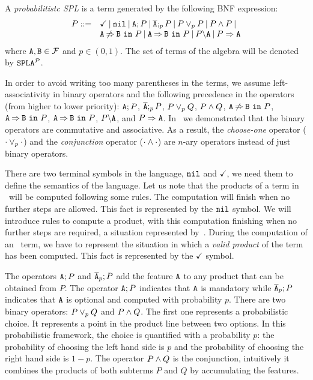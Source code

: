 \bdfn
\label{dfn:syntax}
A \emph{probabilitistc SPL} is a term generated by the following
BNF expression:
$$
\begin{array}{ll}
P::=& \checkmark \barra \nil \barra \feature{A};P \barra
\ofeature{A};_{p} P \barra P \choice_{p} P \barra P \paral P \barra
\\
& \exclude{A}{B}{P}\barra  \require{A}{B}{P}\barra  \forbid{A}{P}\barra  \mandatory{A}{P}\\
\end{array}
$$
\noindent
where $\feature{A},\feature{B} \in \calF$ and $p\in(0,1)$. The set of terms of the
algebra will be denoted by  $\fodaPAp$.
\edfn



In order to avoid writing too many parentheses in the terms, we
assume left-associativity in binary operators and  the
following precedence in the operators (from higher to lower priority):
$\feature{A};P$, $\ofeature{A};_{p} P$, $ P \choice_{p} Q$, $P\paral Q$,
$\exclude{A}{B}{P}$, $\require{A}{B}{P}$,
$\require{A}{B}{P}$,  $\forbid{A}{P}$, and $\mandatory{A}{P}$.
In~\cite{acl13,clc16} we demonstrated that
the binary
operators are commutative and associative.
As a result, the
\emph{choose-one} operator ($\cdot\choice_{p}\cdot$) and the
\emph{conjunction} operator ($\cdot\paral\cdot$) are $n$-ary operators
instead of just binary operators.



There are two terminal symbols in
the language, $\nil$ and $\checkmark$,
we need them to define the semantics of the language.
Let us note that the products of a term in \fodaPA\ will be computed following some rules.
The computation will finish when no further steps are allowed.
This fact is represented by the $\nil$ symbol.
We will introduce rules to compute a product, with this computation
finishing when no further steps are required, a situation represented by~\nil.
During the computation of an \fodaPAp\ term,  we have
to represent the situation in which a \emph{valid product}
of the term has been computed.
This fact is represented by the $\checkmark$ symbol.

The operators $\feature{A};P$ and $\ofeature{A}_{p};P$ add the feature $\feature{A}$ to any product that can be obtained
from $P$. The operator $\feature{A};P$ indicates that $\feature{A}$ is mandatory while $\ofeature{A}_{p};P$ indicates
that $\feature{A}$ is optional and computed with probability $p$.
There are two binary operators: $P \choice_{p} Q$ and $P\paral Q$. The
first one represents a probabilistic choice. It represents a point in
the product line between two options. In this probabilistic framework,
the choice is quantified with a probability \(p\): the probability of
choosing the left hand side is \(p\) and the probability of choosing
the right hand side is \(1-p\). The operator $P\paral Q$ is the
conjunction, intuitively it combines the products of both subterms
\(P\) and \(Q\) by accumulating the features.

